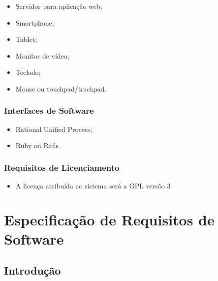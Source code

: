 \begin{apendicesenv}
\begin{itemize}
  \item{Servidor para aplicação web;}
  \item{Smartphone;}
  \item{Tablet;}
  \item{Monitor de vídeo;}
  \item{Teclado;}
  \item{Mouse ou touchpad/trackpad.}
\end{itemize}


\subsection{Interfaces de Software}

\begin{itemize}
  \item{Rational Unified Process;}
  \item{Ruby on Rails.}
\end{itemize}

\subsection{Requisitos de Licenciamento}

\begin{itemize}
  \item{A licença atribuída ao sistema será a GPL versão 3}
\end{itemize}




































\chapter{Especificação de Requisitos de Software}
\label{especificação_de_requisitos_de_software}


\section{Introdução}


\end{apendicesenv}
